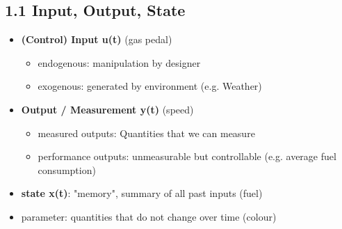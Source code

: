 \subsection{1.1 Input, Output, State}
    \begin{itemize}
        \item \textbf{(Control) Input u(t)} (gas pedal)
        \begin{itemize}
            \item endogenous: manipulation by designer
            \item exogenous: generated by environment (e.g. Weather)
        \end{itemize}
        \item \textbf{Output / Measurement y(t)} (speed)
        \begin{itemize}
            \item measured outputs: Quantities that we can measure
            \item performance outputs: unmeasurable but controllable (e.g. average fuel consumption)
        \end{itemize}
        \item \textbf{state x(t)}: "memory", summary of all past inputs (fuel)
        \item parameter: quantities that do not change over time (colour)
\end{itemize}